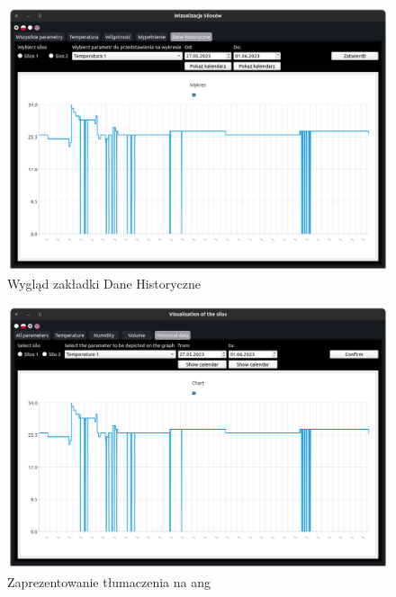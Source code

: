     \begin{figure}[H]
        \centering
        \includegraphics[width = \textwidth]{obrazy/hist_data_tab.png}
        \caption{Wygląd zakładki Dane Historyczne}
        \label{fig: hist data tab}
    \end{figure}


    \begin{figure}[H]
        \centering
        \includegraphics[width = \textwidth]{obrazy/ang.png}
        \caption{Zaprezentowanie tłumaczenia na ang}
        \label{fig: ang}
    \end{figure}


